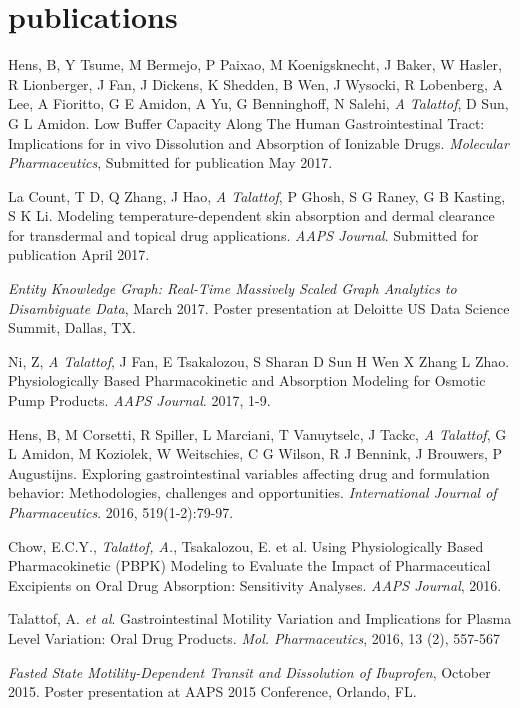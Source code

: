 \documentclass[10pt,twoside]{friggeri-cv}
\begin{document}
\section{publications}

\begin{small}

Hens, B, Y Tsume, M Bermejo, P Paixao, M Koenigsknecht, J Baker, W Hasler, R Lionberger, J Fan, J Dickens, K Shedden, B Wen, J Wysocki, R Lobenberg, A Lee, A Fioritto, G E Amidon, A Yu, G Benninghoff, N Salehi, \emph{A Talattof}, D Sun, G L Amidon. Low Buffer Capacity Along The Human Gastrointestinal Tract: Implications for in vivo Dissolution and Absorption of Ionizable Drugs. \emph{Molecular Pharmaceutics}, Submitted for publication May 2017.

La Count, T D,  Q Zhang, J Hao, \emph{A Talattof}, P Ghosh, S G Raney, G B Kasting, S K Li. Modeling temperature-dependent skin absorption and dermal clearance for transdermal and topical drug applications. \emph{AAPS Journal}. Submitted for publication April 2017.

\emph{Entity Knowledge Graph: Real-Time Massively Scaled Graph Analytics to Disambiguate Data}, March 2017.
Poster presentation at Deloitte US Data Science Summit, Dallas, TX.

Ni, Z, \emph{A Talattof}, J Fan, E Tsakalozou, S Sharan D Sun H Wen X Zhang L Zhao. Physiologically Based Pharmacokinetic and Absorption Modeling for Osmotic Pump Products. \emph{AAPS Journal}. 2017, 1-9.

Hens, B, M Corsetti, R Spiller, L Marciani, T Vanuytselc, J Tackc, \emph{A Talattof},  G L Amidon, M Koziolek, W Weitschies, C G Wilson, R J Bennink, J Brouwers, P Augustijns. Exploring gastrointestinal variables affecting drug and formulation behavior: Methodologies, challenges and opportunities. \emph{International Journal of Pharmaceutics}. 2016, 519(1-2):79-97.

Chow, E.C.Y., \emph{Talattof, A.}, Tsakalozou, E. et al. Using Physiologically Based Pharmacokinetic (PBPK) Modeling to Evaluate the Impact of Pharmaceutical Excipients on Oral Drug Absorption: Sensitivity Analyses. \emph{AAPS Journal}, 2016.

Talattof, A. \emph{et al}. Gastrointestinal Motility Variation and Implications for Plasma Level Variation: Oral Drug Products. \emph{Mol. Pharmaceutics}, 2016, 13 (2), 557-567

\emph{Fasted State Motility-Dependent Transit and Dissolution of Ibuprofen}, October 2015.
Poster presentation at AAPS 2015 Conference, Orlando, FL.


\end{small}
\end{document}
